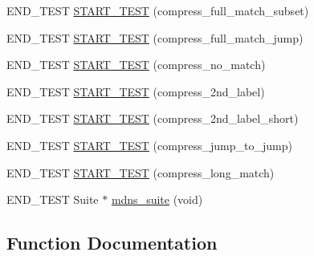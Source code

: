 \begin{DoxyCompactItemize}
\item 
E\+N\+D\+\_\+\+T\+E\+ST \hyperlink{openmote-cc2538_2lwip_2test_2unit_2mdns_2test__mdns_8c_aaee08f2e8c6a214cf6457f839c4f69b3}{S\+T\+A\+R\+T\+\_\+\+T\+E\+ST} (compress\+\_\+full\+\_\+match\+\_\+subset)
\item 
E\+N\+D\+\_\+\+T\+E\+ST \hyperlink{openmote-cc2538_2lwip_2test_2unit_2mdns_2test__mdns_8c_acafe2439f17aece73c01b9e38555ad2a}{S\+T\+A\+R\+T\+\_\+\+T\+E\+ST} (compress\+\_\+full\+\_\+match\+\_\+jump)
\item 
E\+N\+D\+\_\+\+T\+E\+ST \hyperlink{openmote-cc2538_2lwip_2test_2unit_2mdns_2test__mdns_8c_a2963477d0c954d455126b280ece257c5}{S\+T\+A\+R\+T\+\_\+\+T\+E\+ST} (compress\+\_\+no\+\_\+match)
\item 
E\+N\+D\+\_\+\+T\+E\+ST \hyperlink{openmote-cc2538_2lwip_2test_2unit_2mdns_2test__mdns_8c_a8d9a882234d09285a38e87efcf936e1a}{S\+T\+A\+R\+T\+\_\+\+T\+E\+ST} (compress\+\_\+2nd\+\_\+label)
\item 
E\+N\+D\+\_\+\+T\+E\+ST \hyperlink{openmote-cc2538_2lwip_2test_2unit_2mdns_2test__mdns_8c_ade7ed15b94ba1bdee358e6a92b278e22}{S\+T\+A\+R\+T\+\_\+\+T\+E\+ST} (compress\+\_\+2nd\+\_\+label\+\_\+short)
\item 
E\+N\+D\+\_\+\+T\+E\+ST \hyperlink{openmote-cc2538_2lwip_2test_2unit_2mdns_2test__mdns_8c_aee1309a46f2218677f89511c0820c4e1}{S\+T\+A\+R\+T\+\_\+\+T\+E\+ST} (compress\+\_\+jump\+\_\+to\+\_\+jump)
\item 
E\+N\+D\+\_\+\+T\+E\+ST \hyperlink{openmote-cc2538_2lwip_2test_2unit_2mdns_2test__mdns_8c_a16f625c7c9805544ff8727d50ba2829a}{S\+T\+A\+R\+T\+\_\+\+T\+E\+ST} (compress\+\_\+long\+\_\+match)
\item 
E\+N\+D\+\_\+\+T\+E\+ST Suite $\ast$ \hyperlink{openmote-cc2538_2lwip_2test_2unit_2mdns_2test__mdns_8c_aa4b6bb1fde82b8d3df03023d84f8fe6c}{mdns\+\_\+suite} (void)
\end{DoxyCompactItemize}


\subsection{Function Documentation}
\mbox{\label{openmote-cc2538_2lwip_2test_2unit_2mdns_2test__mdns_8c_aa4b6bb1fde82b8d3df03023d84f8fe6c}} 
